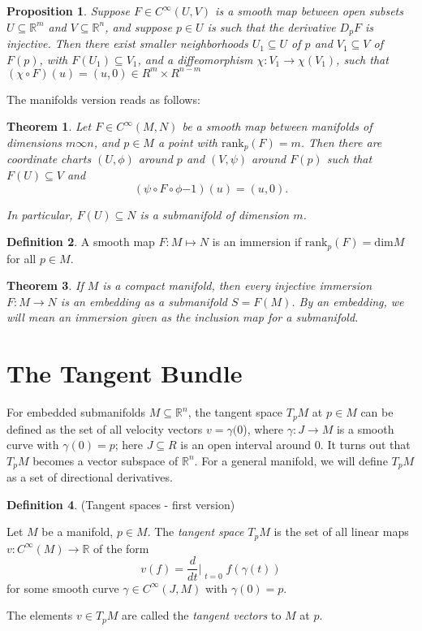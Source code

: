 \documentclass{article}
\newtheorem{theorem}{Theorem}[section]
\newtheorem{proposition}{Proposition}[theorem]
\theoremstyle{definition}
\newtheorem{defn}[theorem]{Definition}
\newenvironment{definition}
  {\vspace{8pt}\begin{mdframed}[backgroundcolor=blueish]\begin{defn}}
  {\end{defn}\end{mdframed}\vspace{4pt}}
\begin{document}
\begin{proposition}
Suppose $F \in C^\infty(U,V)$ is a smooth map between open subsets $U \subseteq \mathbb R^m$ and $V \subseteq \mathbb R^n$, and suppose $p \in U$ is such that the derivative $D_p F$ is injective. Then there exist smaller neighborhoods $U_1 \subseteq U$ of $p$ and $V_1 \subseteq V$ of $F(p)$, with $F(U_1) \subseteq V_1$, and a diffeomorphism $\chi : V_1 \rightarrow \chi(V_1)$, such that $(\chi \circ F)(u) = (u,0) \in R^m \times R^{n-m}$
\end{proposition}

The manifolds version reads as follows: 
\begin{theorem}
Let $F \in C^\infty(M,N)$ be a smooth map between manifolds of dimensions $m \infty n$, and $p \in M$ a point with $\text{rank}_p(F) = m$. Then there are coordinate charts $(U,\phi)$ around $p$ and $(V,\psi)$ around $F(p)$ such that $F(U) \subseteq V$ and 
\[
    (\psi \circ F \circ \phi{-1})(u) = (u,0).
\]

In particular, $F(U) \subseteq N$ is a submanifold of dimension $m$.
\end{theorem}

\begin{definition}
A smooth map $F : M \mapsto N$ is an immersion if $\text{rank}_p(F) = \text{dim}M$ for all $p \in M$.    
\end{definition}

\begin{theorem}
If $M$ is a compact manifold, then every injective immersion $F : M \rightarrow N$ is an embedding as a submanifold $S = F(M)$. By an embedding, we will mean an immersion given as the inclusion map for a submanifold.
\end{theorem}

\newpage
\section{The Tangent Bundle}
For embedded submanifolds $M \subseteq \mathbb R^n$, the tangent space $T_p M$ at $p \in M$ can be defined as the set of all velocity vectors $v = \gamma(0$), where $\gamma : J \rightarrow M$ is a smooth curve with $\gamma(0) = p$; here $J \subseteq R$ is an open interval around $0$. It turns out that $T_pM$ becomes a vector subspace of $\mathbb R^n$. For a general manifold, we will define $T_pM$ as a set of directional derivatives.

\begin{definition} (Tangent spaces - first version)

Let $M$ be a manifold, $p \in M$. The \textit{tangent space} $T_pM$ is the set of all linear maps $v : C^{\infty}(M) \rightarrow \mathbb R$ of the form 
\[
    v(f) = \frac{d}{dt}\Bigr|_{\substack{ t=0 }}  f(\gamma(t))
\]
for some smooth curve $\gamma \in C^\infty(J,M)$ with $\gamma(0) = p$.

The elements $v \in T_pM$ are called the \textit{tangent vectors} to $M$ at $p$.
\end{definition}
\end{document}
